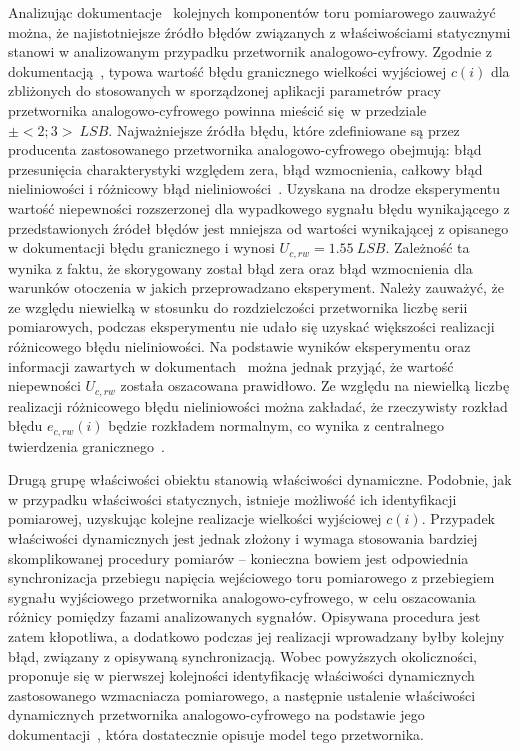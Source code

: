 Analizując dokumentacje~\cite{microchip_manual, stm_manual, diodes_manual, stm_f411} kolejnych komponentów toru pomiarowego zauważyć można, że najistotniejsze źródło błędów związanych z właściwościami statycznymi stanowi w analizowanym przypadku przetwornik analogowo-cyfrowy. Zgodnie z dokumentacją~\cite{stm_f411}, typowa wartość błędu granicznego wielkości wyjściowej $c(i)$ dla zbliżonych do stosowanych w sporządzonej aplikacji parametrów pracy przetwornika analogowo-cyfrowego powinna mieścić się w przedziale $\pm<2; 3>~\unit{LSB}$. Najważniejsze źródła błędu, które zdefiniowane są przez producenta zastosowanego przetwornika analogowo-cyfrowego obejmują: błąd przesunięcia charakterystyki względem zera, błąd wzmocnienia, całkowy błąd nieliniowości i różnicowy błąd nieliniowości~\cite{stm_adc, stm_f411}. Uzyskana na drodze eksperymentu wartość niepewności rozszerzonej dla wypadkowego sygnału błędu wynikającego z przedstawionych źródeł błędów jest mniejsza od wartości wynikającej z opisanego w dokumentacji błędu granicznego i wynosi $U_{c,rw} = \qty{1.55}{LSB}$. Zależność ta wynika z faktu, że skorygowany został błąd zera oraz błąd wzmocnienia dla warunków otoczenia w jakich przeprowadzano eksperyment. Należy zauważyć, że ze względu niewielką w stosunku do rozdzielczości przetwornika liczbę serii pomiarowych, podczas eksperymentu nie udało się uzyskać większości realizacji różnicowego błędu nieliniowości. Na podstawie wyników eksperymentu oraz informacji zawartych w dokumentach~\cite{stm_f411, stm_adc} można jednak przyjąć, że wartość niepewności $U_{c,rw}$ została oszacowana prawidłowo. Ze względu na niewielką liczbę realizacji różnicowego błędu nieliniowości można zakładać, że rzeczywisty rozkład błędu $e_{c,rw}(i)$ będzie rozkładem normalnym, co wynika z centralnego twierdzenia granicznego~\cite{jcgm_guide}.

Drugą grupę właściwości obiektu stanowią właściwości dynamiczne. Podobnie, jak w przypadku właściwości statycznych, istnieje możliwość ich identyfikacji pomiarowej, uzyskując kolejne realizacje wielkości wyjściowej $c(i)$. Przypadek właściwości dynamicznych jest jednak złożony i wymaga stosowania bardziej skomplikowanej procedury pomiarów -- konieczna bowiem jest odpowiednia synchronizacja przebiegu napięcia wejściowego toru pomiarowego z przebiegiem sygnału wyjściowego przetwornika analogowo-cyfrowego, w celu oszacowania różnicy pomiędzy fazami analizowanych sygnałów. Opisywana procedura jest zatem kłopotliwa, a dodatkowo podczas jej realizacji wprowadzany byłby kolejny błąd, związany z opisywaną synchronizacją. Wobec powyższych okoliczności, proponuje się w pierwszej kolejności identyfikację właściwości dynamicznych zastosowanego wzmacniacza pomiarowego, a następnie ustalenie właściwości dynamicznych przetwornika analogowo-cyfrowego na podstawie jego dokumentacji~\cite{stm_f411}, która dostatecznie opisuje model tego przetwornika.

